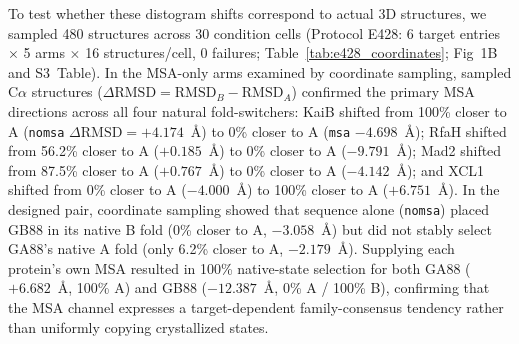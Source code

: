\documentclass[10pt,a4paper]{article}
\begin{document}
To test whether these distogram shifts correspond to actual 3D structures, we sampled 480 structures across 30 condition cells (Protocol E428: 6 target entries $\times$ 5 arms $\times$ 16 structures/cell, 0 failures; Table~\ref{tab:e428_coordinates}; Fig~1B and S3~Table). In the MSA-only arms examined by coordinate sampling, sampled C$\alpha$ structures ($\Delta\mathrm{RMSD} = \mathrm{RMSD}_B - \mathrm{RMSD}_A$) confirmed the primary MSA directions across all four natural fold-switchers: KaiB shifted from 100\% closer to A (\texttt{nomsa} $\Delta\mathrm{RMSD} = +4.174$~\AA{}) to 0\% closer to A (\texttt{msa} $-4.698$~\AA{}); RfaH shifted from 56.2\% closer to A ($+0.185$~\AA{}) to 0\% closer to A ($-9.791$~\AA{}); Mad2 shifted from 87.5\% closer to A ($+0.767$~\AA{}) to 0\% closer to A ($-4.142$~\AA{}); and XCL1 shifted from 0\% closer to A ($-4.000$~\AA{}) to 100\% closer to A ($+6.751$~\AA{}). In the designed pair, coordinate sampling showed that sequence alone (\texttt{nomsa}) placed GB88 in its native B fold (0\% closer to A, $-3.058$~\AA{}) but did not stably select GA88's native A fold (only 6.2\% closer to A, $-2.179$~\AA{}). Supplying each protein's own MSA resulted in 100\% native-state selection for both GA88 ($+6.682$~\AA{}, 100\% A) and GB88 ($-12.387$~\AA{}, 0\% A / 100\% B), confirming that the MSA channel expresses a target-dependent family-consensus tendency rather than uniformly copying crystallized states.
\end{document}
